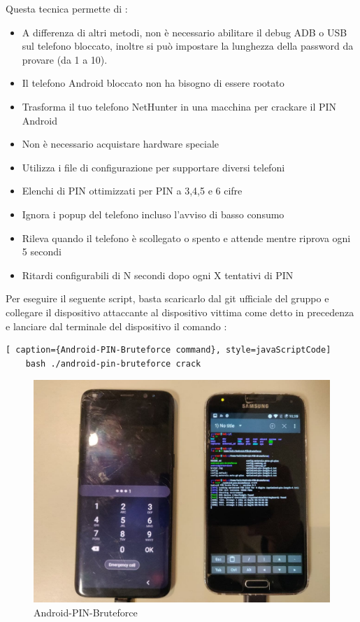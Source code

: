 Questa tecnica permette di :
\begin{itemize}
	\item A differenza di altri metodi, non è necessario abilitare il debug ADB o USB sul telefono bloccato, inoltre si può impostare la lunghezza della password da provare (da 1 a 10).
	\item Il telefono Android bloccato non ha bisogno di essere rootato
	\item Trasforma il tuo telefono NetHunter in una macchina per crackare il PIN Android
	\item Non è necessario acquistare hardware speciale
	\item Utilizza i file di configurazione per supportare diversi telefoni
	\item Elenchi di PIN ottimizzati per PIN a 3,4,5 e 6 cifre
	\item Ignora i popup del telefono incluso l’avviso di basso consumo
	\item Rileva quando il telefono è scollegato o spento e attende mentre riprova ogni 5 secondi
	\item Ritardi configurabili di N secondi dopo ogni X tentativi di PIN
\end{itemize}

Per eseguire il seguente script, basta scaricarlo dal git ufficiale del gruppo e collegare il dispositivo attaccante al dispositivo vittima come detto in precedenza e lanciare dal terminale del dispositivo il comando :

\begin{lstlisting}[ caption={Android-PIN-Bruteforce command}, style=javaScriptCode]
	bash ./android-pin-bruteforce crack
\end{lstlisting}

\begin{figure}[h!]
    \centering
    \includegraphics[width=140mm]{Immagini/3/brute.jpg}
    \caption{Android-PIN-Bruteforce}
    \label{fig:Android-PIN-Bruteforce}
\end{figure}

